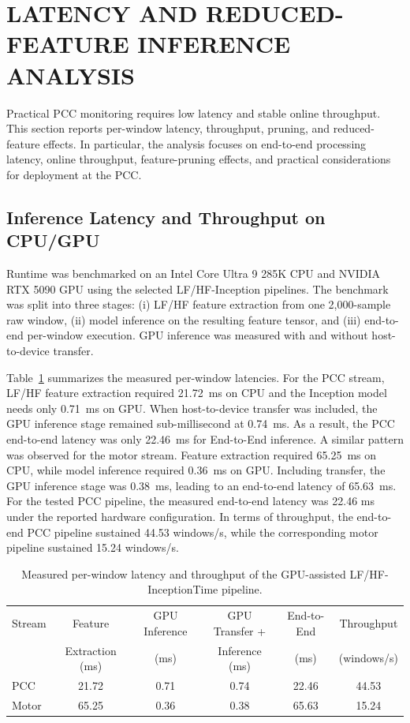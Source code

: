 \documentclass[lettersize,journal]{IEEEtran}
\begin{document}
\section{LATENCY AND REDUCED-FEATURE INFERENCE ANALYSIS}
\label{sec:realtime}
Practical PCC monitoring requires low latency and stable online throughput. This section reports per-window latency, throughput, pruning, and reduced-feature effects. In particular, the analysis focuses on end-to-end processing latency, online throughput, feature-pruning effects, and practical considerations for deployment at the PCC. 

\subsection{Inference Latency and Throughput on CPU/GPU}
\label{sec:latency_throughput}
Runtime was benchmarked on an Intel Core Ultra 9 285K CPU and NVIDIA RTX 5090 GPU using the selected LF/HF-Inception pipelines. The benchmark was split into three stages: (i) LF/HF feature extraction from one 2{,}000-sample raw window, (ii) model inference on the resulting feature tensor, and (iii) end-to-end per-window execution. GPU inference was measured with and without host-to-device transfer.

Table~\ref{tab:runtime_latency} summarizes the measured per-window latencies. For the PCC stream, LF/HF feature extraction required 21.72~ms on CPU and the Inception model needs only 0.71~ms on GPU. When host-to-device transfer was included, the GPU inference stage remained sub-millisecond at 0.74~ms. As a result, the PCC end-to-end latency was only 22.46~ms for End-to-End inference.
A similar pattern was observed for the motor stream. Feature extraction required 65.25~ms on CPU, while model inference required 0.36~ms on GPU. Including transfer, the GPU inference stage was 0.38~ms, leading to an end-to-end latency of 65.63~ms. For the tested PCC pipeline, the measured end-to-end latency was 22.46 ms under the reported hardware configuration. In terms of throughput, the end-to-end PCC pipeline sustained 44.53 windows/s, while the corresponding motor pipeline sustained 15.24 windows/s. 

\begin{table}[t]
\centering
\scriptsize
\caption{Measured per-window latency and throughput of the GPU-assisted LF/HF-InceptionTime pipeline.}
\label{tab:runtime_latency}
\renewcommand{\arraystretch}{1.15}
\setlength{\tabcolsep}{3pt}
\begin{tabular}{l c c c c c}
\hline
Stream & Feature & GPU Inference & GPU Transfer + & End-to-End & Throughput \\
 & Extraction (ms) & (ms) & Inference (ms) & (ms) & (windows/s) \\
\hline
PCC   & 21.72 & 0.71 & 0.74 & 22.46 & 44.53 \\
Motor & 65.25 & 0.36 & 0.38 & 65.63 & 15.24 \\
\hline
\end{tabular}
\end{table}
\end{document}
